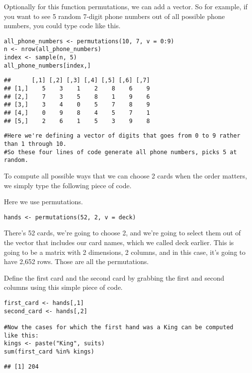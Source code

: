 \documentclass[
]{article}
\begin{document}
Optionally for this function permutations, we can add a vector. So for
example, if you want to see 5 random 7-digit phone numbers out of all
possible phone numbers, you could type code like this.

\begin{verbatim}
all_phone_numbers <- permutations(10, 7, v = 0:9)
n <- nrow(all_phone_numbers)
index <- sample(n, 5)
all_phone_numbers[index,]
\end{verbatim}

\begin{verbatim}
##      [,1] [,2] [,3] [,4] [,5] [,6] [,7]
## [1,]    5    3    1    2    8    6    9
## [2,]    7    3    5    8    1    9    6
## [3,]    3    4    0    5    7    8    9
## [4,]    0    9    8    4    5    7    1
## [5,]    2    6    1    5    3    9    8
\end{verbatim}

\begin{verbatim}
#Here we're defining a vector of digits that goes from 0 to 9 rather than 1 through 10.
#So these four lines of code generate all phone numbers, picks 5 at random.
\end{verbatim}

To compute all possible ways that we can choose 2 cards when the order
matters, we simply type the following piece of code.

Here we use permutations.

\begin{verbatim}
hands <- permutations(52, 2, v = deck)
\end{verbatim}

There's 52 cards, we're going to choose 2, and we're going to select
them out of the vector that includes our card names, which we called
deck earlier. This is going to be a matrix with 2 dimensions, 2 columns,
and in this case, it's going to have 2,652 rows. Those are all the
permutations.

Define the first card and the second card by grabbing the first and
second columns using this simple piece of code.

\begin{verbatim}
first_card <- hands[,1]
second_card <- hands[,2]

#Now the cases for which the first hand was a King can be computed like this:
kings <- paste("King", suits)
sum(first_card %in% kings)
\end{verbatim}

\begin{verbatim}
## [1] 204
\end{verbatim}
\end{document}
